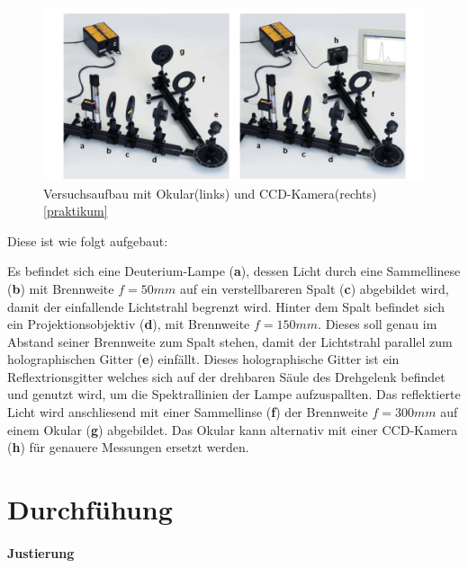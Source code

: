 \begin{figure}[htbp]
    \centering
    \includegraphics[width=0.7\linewidth]{figs/aufbau_balmer_serie.png}
    \caption{Versuchsaufbau mit Okular(links) und CCD-Kamera(rechts) \ref{praktikum}}
    \label{fig:balmeraufbau}
\end{figure}
Diese ist wie folgt aufgebaut: 

Es befindet sich eine Deuterium-Lampe (\textbf{a}), dessen Licht durch eine Sammellinese (\textbf{b}) mit Brennweite $f = 50mm$ auf ein verstellbareren Spalt (\textbf{c}) abgebildet wird, damit der einfallende Lichtstrahl begrenzt wird. 
Hinter dem Spalt befindet sich ein Projektionsobjektiv (\textbf{d}), mit Brennweite $f = 150mm$. 
Dieses soll genau im Abstand seiner Brennweite zum Spalt stehen, damit der Lichtstrahl parallel zum holographischen Gitter (\textbf{e}) einfällt. 
Dieses holographische Gitter ist ein Reflextrionsgitter welches sich auf der drehbaren Säule des Drehgelenk befindet und genutzt wird, um die Spektrallinien der Lampe aufzuspallten. 
Das reflektierte Licht wird anschliesend mit einer Sammellinse (\textbf{f}) der Brennweite $f=300mm$ auf einem Okular (\textbf{g}) abgebildet.
Das Okular kann alternativ mit einer CCD-Kamera (\textbf{h}) für genauere Messungen ersetzt werden.

\section{Durchfühung}

\paragraph{Justierung}

